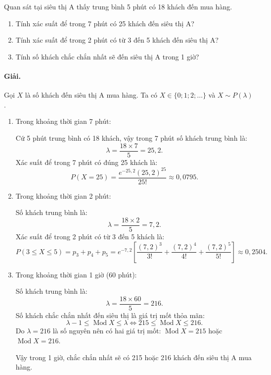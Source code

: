 \begin{vidu}[VD 1]
Quan sát tại siêu thị A thấy trung bình 5 phút có 18 khách đến mua hàng.
\begin{enumerate}[label=\arabic*)]
    \item Tính xác suất để trong 7 phút có 25 khách đến siêu thị A?
    \item Tính xác suất để trong 2 phút có từ 3 đến 5 khách đến siêu thị A?
    \item Tính số khách chắc chắn nhất sẽ đến siêu thị A trong 1 giờ?
\end{enumerate}

\paragraph{Giải.}
Gọi $X$ là số khách đến siêu thị A mua hàng. Ta có $X \in \{0; 1; 2; \dots\}$ và $X \sim P(\lambda)$.

\begin{enumerate}[label=\arabic*)]
    \item Trong khoảng thời gian 7 phút:
    
    Cứ 5 phút trung bình có 18 khách, vậy trong 7 phút số khách trung bình là:
    \[
    \lambda = \frac{18 \times 7}{5} = 25{,}2.
    \]
    Xác suất để trong 7 phút có đúng 25 khách là:
    \[
    P(X = 25) = \frac{e^{-25{,}2} (25{,}2)^{25}}{25!} \approx 0{,}0795.
    \]

    \item Trong khoảng thời gian 2 phút:
    
    Số khách trung bình là:
    \[
    \lambda = \frac{18 \times 2}{5} = 7{,}2.
    \]
    Xác suất để trong 2 phút có từ 3 đến 5 khách là:
    \[
    P(3 \le X \le 5) = p_3 + p_4 + p_5 = e^{-7{,}2} \left[ \frac{(7{,}2)^3}{3!} + \frac{(7{,}2)^4}{4!} + \frac{(7{,}2)^5}{5!} \right] \approx 0{,}2504.
    \]

    \item Trong khoảng thời gian 1 giờ (60 phút):
    
    Số khách trung bình là:
    \[
    \lambda = \frac{18 \times 60}{5} = 216.
    \]
    Số khách chắc chắn nhất đến siêu thị là giá trị mốt thỏa mãn:
    \[
    \lambda - 1 \le \operatorname{Mod} X \le \lambda \iff 215 \le \operatorname{Mod} X \le 216.
    \]
    Do $\lambda = 216$ là số nguyên nên có hai giá trị mốt: $\operatorname{Mod} X = 215$ hoặc $\operatorname{Mod} X = 216$.
    
    Vậy trong 1 giờ, chắc chắn nhất sẽ có 215 hoặc 216 khách đến siêu thị A mua hàng.
\end{enumerate}
\end{vidu}


